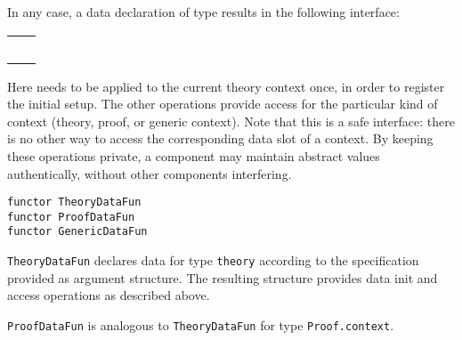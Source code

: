\begin{isabellebody}
\begin{isamarkuptext}
  \bigskip In any case, a data declaration of type  results
  in the following interface:

  \medskip
  \begin{tabular}{ll}
  \isa{init{\isacharcolon}\ theory\ {\isasymrightarrow}\ theory} \\
  \isa{get{\isacharcolon}\ context\ {\isasymrightarrow}\ T} \\
  \isa{put{\isacharcolon}\ T\ {\isasymrightarrow}\ context\ {\isasymrightarrow}\ context} \\
  \isa{map{\isacharcolon}\ {\isacharparenleft}T\ {\isasymrightarrow}\ T{\isacharparenright}\ {\isasymrightarrow}\ context\ {\isasymrightarrow}\ context} \\
  \isa{print{\isacharcolon}\ context\ {\isasymrightarrow}\ unit}
  \end{tabular}
  \medskip

  \noindent Here  needs to be applied to the current
  theory context once, in order to register the initial setup.  The
  other operations provide access for the particular kind of context
  (theory, proof, or generic context).  Note that this is a safe
  interface: there is no other way to access the corresponding data
  slot of a context.  By keeping these operations private, a component
  may maintain abstract values authentically, without other components
  interfering.%
\end{isamarkuptext}%
\isamarkuptrue%
%
\isadelimmlref
%
\endisadelimmlref
%
\isatagmlref
%
\begin{isamarkuptext}%
\begin{mldecls}
  \verb|functor TheoryDataFun| \\
  \verb|functor ProofDataFun| \\
  \verb|functor GenericDataFun| \\
  \end{mldecls}

  \begin{description}

  \item \verb|TheoryDataFun| declares data for
  type \verb|theory| according to the specification provided as
  argument structure.  The resulting structure provides data init and
  access operations as described above.

  \item \verb|ProofDataFun| is analogous to
  \verb|TheoryDataFun| for type \verb|Proof.context|.


\end{description}
\end{isamarkuptext}
\end{isabellebody}
